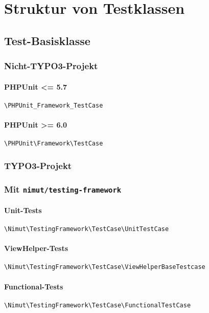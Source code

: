 \documentclass[a4paper,11pt,headsepline]{scrartcl}
\begin{document}
\pagebreak
\section{Struktur von Testklassen}

\subsection{Test-Basisklasse}

\subsubsection{Nicht-TYPO3-Projekt}
\paragraph{PHPUnit <= 5.7} \texttt{\textbackslash PHPUnit\_Framework\_TestCase}
\paragraph{PHPUnit >= 6.0} \texttt{\textbackslash PHPUnit\textbackslash Framework\textbackslash TestCase}

\subsubsection{TYPO3-Projekt}
\subsubsection{Mit \texttt{nimut/testing-framework}}

\paragraph{Unit-Tests}
\texttt{\textbackslash Nimut\textbackslash TestingFramework\textbackslash TestCase\textbackslash UnitTestCase}

\paragraph{ViewHelper-Tests}
\texttt{\textbackslash Nimut\textbackslash TestingFramework\textbackslash TestCase\textbackslash ViewHelperBaseTestcase}

\paragraph{Functional-Tests}
\texttt{\textbackslash Nimut\textbackslash TestingFramework\textbackslash TestCase\textbackslash FunctionalTestCase}
\end{document}
